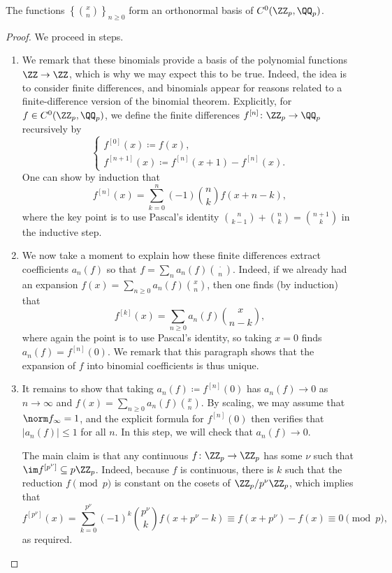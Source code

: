 \documentclass{article}
\begin{document}
\begin{proposition}
	The functions $\left\{\binom xn\right\}_{n\ge0}$ form an orthonormal basis of $C^0(\ZZ_p,\QQ_p)$.
\end{proposition}
\begin{proof}
	We proceed in steps.
	\begin{enumerate}
		\item We remark that these binomials provide a basis of the polynomial functions $\ZZ\to\ZZ$, which is why we may expect this to be true. Indeed, the idea is to consider finite differences, and binomials appear for reasons related to a finite-difference version of the binomial theorem. Explicitly, for $f\in C^0(\ZZ_p,\QQ_p)$, we define the finite differences $f^{[n]}\colon\ZZ_p\to\QQ_p$ recursively by
		\[\begin{cases}
			f^{[0]}(x)\coloneqq f(x), \\
			f^{[n+1]}(x)\coloneqq f^{[n]}(x+1)-f^{[n]}(x).
		\end{cases}\]
		One can show by induction that
		\[f^{[n]}(x)=\sum_{k=0}^n(-1)\binom nkf(x+n-k),\]
		where the key point is to use Pascal's identity $\binom n{k-1}+\binom nk=\binom{n+1}k$ in the inductive step.

		\item We now take a moment to explain how these finite differences extract coefficients $a_n(f)$ so that $f=\sum_na_n(f)\binom\cdot n$. Indeed, if we already had an expansion $f(x)=\sum_{n\ge0}a_n(f)\binom xn$, then one finds (by induction) that
		\[f^{[k]}(x)=\sum_{n\ge0}a_n(f)\binom x{n-k},\]
		where again the point is to use Pascal's identity, so taking $x=0$ finds $a_n(f)=f^{[n]}(0)$. We remark that this paragraph shows that the expansion of $f$ into binomial coefficients is thus unique.

		\item It remains to show that taking $a_n(f)\coloneqq f^{[n]}(0)$ has $a_n(f)\to0$ as $n\to\infty$ and $f(x)=\sum_{n\ge0}a_n(f)\binom xn$. By scaling, we may assume that $\norm f_\infty=1$, and the explicit formula for $f^{[n]}(0)$ then verifies that $\left|a_n(f)\right|\le1$ for all $n$. In this step, we will check that $a_n(f)\to0$.

		The main claim is that any continuous $f\colon\ZZ_p\to\ZZ_p$ has some $\nu$ such that $\im f^{[p^\nu]}\subseteq p\ZZ_p$. Indeed, because $f$ is continuous, there is $k$ such that the reduction $f\pmod p$ is constant on the cosets of $\ZZ_p/p^\nu\ZZ_p$, which implies that
		\[f^{[p^\nu]}(x)=\sum_{k=0}^{p^\nu}(-1)^k\binom{p^\nu}kf\left(x+p^\nu-k\right)\equiv f\left(x+p^\nu\right)-f(x)\equiv0\pmod p,\]
		as required.


\end{enumerate}
\end{proof}
\end{document}
